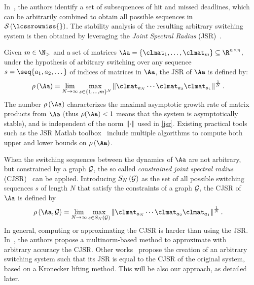 In~\cite{Maggio:2020}, the authors identify a set of subsequences of hit and missed deadlines, which can be arbitrarily combined to obtain all possible sequences in $\sset{}{\lcssrowmiss{}}$.
The stability analysis of the resulting arbitrary switching system is then obtained by leveraging the \emph{Joint Spectral Radius} (JSR)~\cite{rota}.

Given $m \in \N_{>}$ and a set of matrices $\Aa = \{\clmat_1, \ldots, \clmat_m \} \subseteq \R^{n\times n}$, under the hypothesis of arbitrary switching over any sequence $s=\seq{a_1,a_2,\dots}$ of indices of matrices in $\Aa$, the JSR of $\Aa$ is defined by:
\begin{equation}%
    \label{jsr}
    \rho\funof{\Aa} = \lim_{N\rightarrow\infty} \max_{s \in \{1,\ldots,m\}^N} \norm{\clmat_{a_N} \cdots \clmat_{a_2}\clmat_{a_1}}^{\frac{1}{N}}.
\end{equation}
The number $\rho\left(\Aa\right)$ characterizes the maximal asymptotic growth rate of matrix products from $\Aa$ (thus $\rho(\Aa) < 1$ means that the system is asymptotically stable), and is independent of the norm $\left\lVert\cdot\right\rVert$ used in \eqref{jsr}.
Existing practical tools such as the JSR Matlab toolbox~\cite{vankeerberghen2014jsr} include multiple algorithms to compute both upper and lower bounds on $\rho\left(\Aa\right)$.

When the switching sequences between the dynamics of $\Aa$ are not arbitrary, but constrained by a graph $\mathcal{G}_{}$, the so called \emph{constrained joint spectral radius} (CJSR)~\cite{dai2012gelfand} can be applied.
Introducing $S_N\left( \mathcal{G}_{} \right)$ as the set of all possible switching sequences $s$ of length $N$ that satisfy the constraints of a graph $\mathcal{G}_{}$, the CJSR of $\Aa$ is defined by
\begin{equation}%
    \label{cjsr}%
    \rho\funof{\Aa,\GG{}} = \lim_{N\rightarrow\infty} \max_{s \in S_N\funof{\GG{}}} \norm{\clmat_{a_N} \cdots \clmat_{a_2}\clmat_{a_1}}^{\frac{1}{N}}.
\end{equation}
In general, computing or approximating the CJSR is harder than using the JSR. 
In~\cite{philippe2016stability}, the authors propose a multinorm-based method to approximate with arbitrary accuracy the CJSR.
Other works~\cite{kozyakin2014berger,xu2020approximation} propose the creation of an arbitrary switching system such that its JSR is equal to the CJSR of the original system, based on a Kronecker lifting method.
This will be also our approach, as detailed later.

